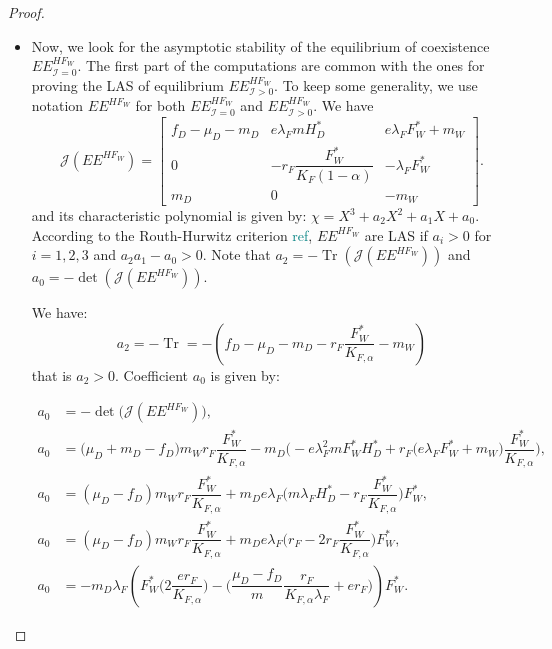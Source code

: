 \documentclass{article}
\newcommand{\lfw}{\lambda_{F}}
\newcommand{\lfw}{\lambda_{F}}
\newcommand{\cI}{\mathcal{I}}
\newcommand{\marc}[1]{\textcolor{teal}{#1}}
\DeclareMathOperator{\Tr}{Tr}
\begin{document}
\begin{proof}
\begin{itemize}
\item Now, we look for the asymptotic stability of the equilibrium of coexistence $EE^{HF_W}_{\cI=0}$. The first part of the computations are common with the ones for proving the LAS of equilibrium $EE^{HF_W}_{\cI >0}$.   To keep some generality, we use notation $EE^{HF_W}$ for both $EE^{HF_W}_{\cI =0}$ and $EE^{HF_W}_{\cI >0}$. We have 
\begin{equation*}
\mathcal{J}(EE^{H F_W}) = \begin{bmatrix}
f_D -\mu_D - m_D & e \lfw m H_D^* & e \lfw F^*_W +m_W \\
0 & -r_F \dfrac{F_W^*}{K_F(1-\alpha)} & - \lfw F_W^* \\
m_D & 0 & -m_W
\end{bmatrix}.
\end{equation*} and its characteristic polynomial is given by: $\chi = X^3 + a_2 X^2 + a_1 X + a_0$. According to the Routh-Hurwitz criterion \marc{ref}, $EE^{H F_W}$ are LAS if $a_i > 0$ for $i=1,2,3$ and $a_2 a_1 - a_0 > 0$. Note that $a_2 = - \Tr(\mathcal{J}(EE^{H F_W}))$ and $a_0 = - \det (\mathcal{J}(EE^{H F_W}))$.

We have:
\begin{equation}\label{expressionA2}
a_2 = - \Tr = -(f_D - \mu_D - m_D - r_F \dfrac{F_W^*}{K_{F, \alpha}} - m_W)
\end{equation}
that is $a_2>0$. Coefficient $a_0$ is given by:

\begin{subequations}
\begin{align}
a_0 &= -\det\Big(\mathcal{J}(EE^{H F_W})\Big), \\
a_0 &= \Big(\mu_D + m_D -f_D \Big) m_W r_F \dfrac{F^*_W}{K_{F, \alpha}} - m_D\Big(-e\lfw ^2 m F_W^* H_D^* + r_F \big(e \lfw F^*_W + m_W \big) \dfrac{F^*_W}{K_{F, \alpha}} \Big), \\
a_0 &= (\mu_D-f_D) m_W r_F \dfrac{F^*_W}{K_{F, \alpha}} + m_D e \lfw \Big( m \lfw H_D^* - r_F \dfrac{F^*_W}{K_{F, \alpha}} \Big) F^*_W, \\
a_0 &= (\mu_D-f_D) m_W r_F \dfrac{F^*_W}{K_{F, \alpha}} + m_D e \lfw \Big( r_F - 2 r_F \dfrac{F^*_W}{K_{F, \alpha}} \Big) F^*_W, \\
a_0 &= - m_D \lfw \left( F_W^* \Big(2 \dfrac{e r_F}{K_{F, \alpha}} \Big) - \Big(\dfrac{\mu_D - f_D}{m} \dfrac{r_F}{K_{F, \alpha} \lfw} + er_F \Big) \right) F_W^*. \label{expressionA0}
\end{align}
\end{subequations}


\end{itemize}
\end{proof}
\end{document}
